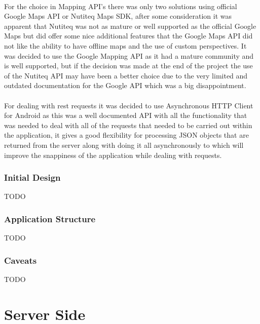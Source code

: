 \\
For the choice in Mapping API's there was only two solutions using official Google Maps API or Nutiteq Maps SDK, after some consideration it was apparent that Nutiteq was not as mature or well supported as the official Google Maps but did offer some nice additional features that the Google Maps API did not like the ability to have offline maps and the use of custom perspectives. It was decided to use the Google Mapping API as it had a mature community and is well supported, but if the decision was made at the end of the project the use of the Nutiteq API may have been a better choice due to the very limited and outdated documentation for the Google API which was a big disappointment.\\
\\
For dealing with rest requests it was decided to use Asynchronous HTTP Client for Android \cite{nknj:AndroidAsynchronousHttpClientloopjandthePersistentCookieStore:2013:online} as this was a well documented API with all the functionality that was needed to deal with all of the requests that needed to be carried out within the application, it gives a good flexibility for processing JSON objects that are returned from the server along with doing it all asynchronously to which will improve the snappiness of the application while dealing with requests.\\

\subsubsection*{Initial Design}

{TODO}

\subsubsection*{Application Structure}

{TODO}

\subsubsection*{Caveats}

{TODO}




\section{Server Side}

